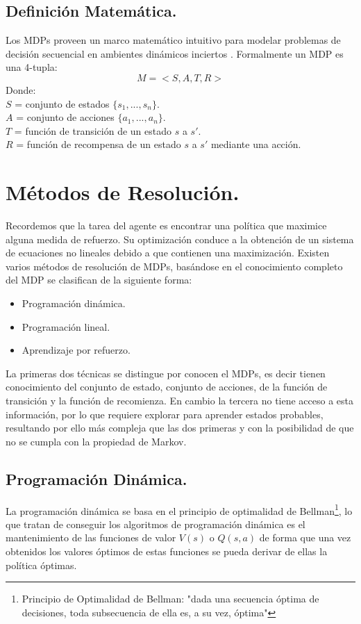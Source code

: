 \subsection{Definición Matemática.}
Los MDPs proveen un marco matemático intuitivo para modelar problemas de decisión secuencial en ambientes dinámicos inciertos . Formalmente un MDP es una 4-tupla:
$$M=< S,A,T,R >$$
Donde:\\
$S$ = conjunto de estados $\{s_{1},...,s_{n}\}$.\\
$A$ = conjunto de acciones $\{a_{1},...,a_{n}\}$.\\
$T$ = función de transición de un estado $s$ a $s'$.\\
$R$ = función de recompensa de un estado $s$ a $s'$ mediante una acción.\\

\section{Métodos de Resolución.}
Recordemos que la tarea del agente es encontrar una política que maximice alguna medida de refuerzo. Su optimización conduce a la obtención de un sistema de ecuaciones no lineales debido a que contienen una maximización. Existen varios métodos de resolución de MDPs, basándose en el conocimiento completo del MDP se clasifican de la siguiente forma:

\begin{itemize}
	\item Programación dinámica.
	\item Programación lineal.
	\item Aprendizaje por refuerzo.
\end{itemize}

La primeras dos técnicas se distingue por conocen el MDPs, es decir tienen conocimiento del conjunto de estado, conjunto de acciones, de la función de transición y la función de recomienza. En cambio la tercera no tiene acceso a esta información, por lo que requiere explorar para aprender estados probables, resultando por ello más compleja que las dos primeras y con la posibilidad de que no se cumpla con la propiedad de Markov.

\subsection{Programación Dinámica.}
La programación dinámica se basa en el principio de optimalidad de Bellman\footnote{Principio de Optimalidad de Bellman: "dada una secuencia óptima de decisiones, toda subsecuencia de ella es, a su vez, óptima"}, lo que tratan de conseguir los algoritmos de programación dinámica es el mantenimiento de las funciones de valor $V (s)$ o $Q(s, a)$ de forma que una vez obtenidos los valores óptimos de estas funciones se pueda derivar de ellas la política óptimas.\\

